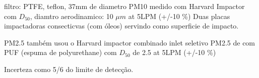 filtro: PTFE, teflon, 37mm de diametro
PM10 medido com Harvard Impactor com $D_50$, diamtro aerodinamico: 10 $\mu m$  at 5LPM (+/-10 \%) 
Duas placas impactadoras consecticvas (com óleos) servindo como superficie de impacto.

PM2.5 também usou o Harvard impactor combinado inlet seletivo PM2.5 de com PUF (espuma de polyurethane) com $D_50$ de 2.5 at 5LPM (+/-10 \%)


 Incerteza como 5/6 do limite de detecção. 
